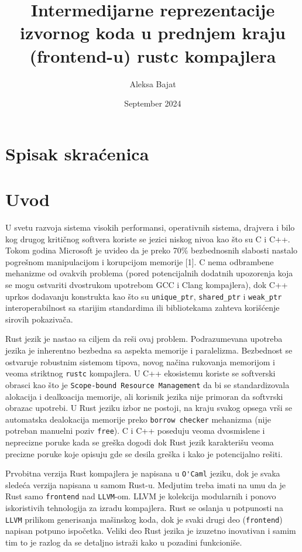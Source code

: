 \documentclass[11pt]{article}
\title{Intermedijarne reprezentacije izvornog koda u prednjem kraju (frontend-u) rustc kompajlera}
\author{Aleksa Bajat}
\date{September 2024}
\begin{document}

\newpage
\section{Spisak skraćenica}
\newpage
\tableofcontents
\newpage

\section{Uvod}

U svetu razvoja sistema visokih performansi, operativnih sistema, drajvera i bilo kog drugog kritičnog softvera koriste se jezici niskog nivoa kao što su C i C++.
Tokom godina Microsoft je uvideo da je preko 70\% bezbednosnih slabosti nastalo pogrešnom manipulacijom i korupcijom memorije [1]. 
C nema odbrambene mehanizme od ovakvih problema (pored potencijalnih dodatnih upozorenja koja se mogu ostvariti dvostrukom upotrebom GCC i Clang kompajlera), dok C++ uprkos dodavanju konstrukta kao što su \verb|unique_ptr|, \verb|shared_ptr| i \verb|weak_ptr| interoperabilnost sa starijim standardima ili bibliotekama zahteva korišćenje sirovih pokazivača. 

Rust jezik je nastao sa ciljem da reši ovaj problem. Podrazumevana upotreba jezika je inherentno bezbedna sa aspekta memorije i paralelizma. Bezbednost se ostvaruje robustnim sistemom tipova, novog načina rukovanja memorijom i veoma striktnog \verb|rustc| kompajlera.
U C++ ekosistemu koriste se softverski obrasci kao što je \verb|Scope-bound Resource Management| da bi se standardizovala alokacija i dealkoacija memorije, ali korisnik jezika nije primoran da softvrski obrazac upotrebi. U Rust jeziku izbor ne postoji, na kraju svakog opsega vrši se automatska dealokacija memorije preko \verb|borrow checker| mehanizma (nije potreban manuelni poziv \verb|free|).
C i C++ poseduju veoma dvosmislene i neprecizne poruke kada se greška dogodi dok Rust jezik karakterišu veoma precizne poruke koje opisuju gde se desila greška i kako je potencijalno rešiti.

Prvobitna verzija Rust kompajlera je napisana u \verb|O'Caml| jeziku, dok je svaka sledeća verzija napisana u samom Rust-u.
Medjutim treba imati na umu da je Rust samo \verb|frontend| nad \verb|LLVM|-om. LLVM je kolekcija modularnih i ponovo iskoristivih tehnologija za izradu kompajlera. Rust se oslanja u potpunosti na \verb|LLVM| prilikom generisanja mašinskog koda, dok je svaki drugi deo
(\verb|frontend|) napisan potpuno ispočetka.
Veliki deo Rust jezika je izuzetno inovativan i samim tim to je razlog da se detaljno istraži kako u pozadini funkcioniše.
\end{document}
